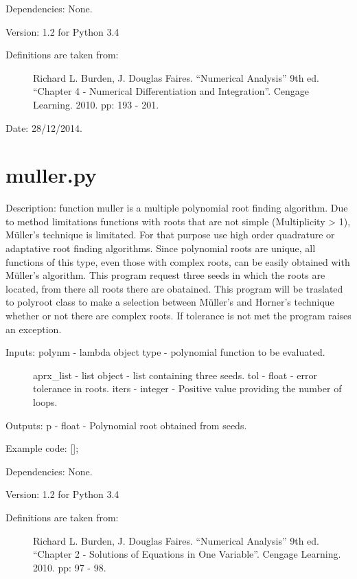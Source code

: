 \documentclass[letterpaper,10pt,oneside]{sphinxmanual}
\theoremstyle{plain}%
\theoremstyle{definition}%
\theoremstyle{remark}%
\begin{document}
Dependencies: None.

Version: 1.2 for Python 3.4
\begin{description}
\item[{Definitions are taken from:}] \leavevmode
Richard L. Burden, J. Douglas Faires. ``Numerical Analysis'' 9th ed.
``Chapter 4 - Numerical Differentiation and Integration''. 
Cengage Learning. 2010. pp: 193 - 201.

\end{description}




Date: 28/12/2014.


\section{muller.py}
\label{code:module-muller}\label{code:muller-py}
Description: function muller is a multiple polynomial root finding algorithm.
Due to method limitations functions with roots that are not simple
(Multiplicity \textgreater{} 1), Müller's technique is limitated. For that purpose use
high order quadrature or adaptative root finding algorithms. Since polynomial
roots are unique, all functions of this type, even those with complex roots,
can be easily obtained with Müller's algorithm. This program request
three seeds in which the roots are located, from there all roots there are
obatained. This program will be traslated to polyroot class to make a
selection between  Müller's and Horner's technique whether or not there are
complex roots. If tolerance is not met the program raises an exception.
\begin{description}
\item[{Inputs: polynm - lambda object type - polynomial function to be evaluated.}] \leavevmode
aprx\_list - list object - list containing three seeds.
tol - float - error tolerance in roots.
iters - integer - Positive value providing the number of loops.

\end{description}

Outputs: p - float - Polynomial root obtained from seeds.

Example code: {[}{]};

Dependencies: None.

Version: 1.2 for Python 3.4
\begin{description}
\item[{Definitions are taken from:}] \leavevmode
Richard L. Burden, J. Douglas Faires. ``Numerical Analysis'' 9th ed.
``Chapter 2 - Solutions of Equations in One Variable''. 
Cengage Learning. 2010. pp: 97 - 98.

\end{description}
\end{document}
